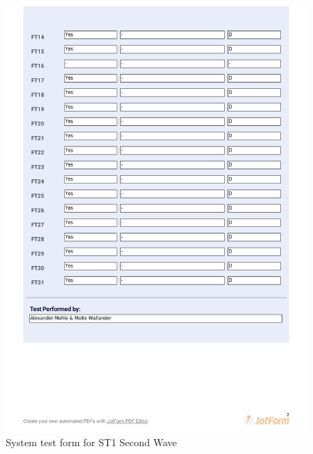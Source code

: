 \documentclass{article}
\begin{document}
 \begin{figure}
     \centering
     \includegraphics[trim={0cm 15cm 0cm 0cm}, clip,width=13cm]{images/2021-03-08_Alexander_ST1-2}
     \renewcommand\figurename{Figure}
     \caption{System test form for ST1 Second Wave}
     \label{fig:my_label}
 \end{figure}
 
\end{document}

